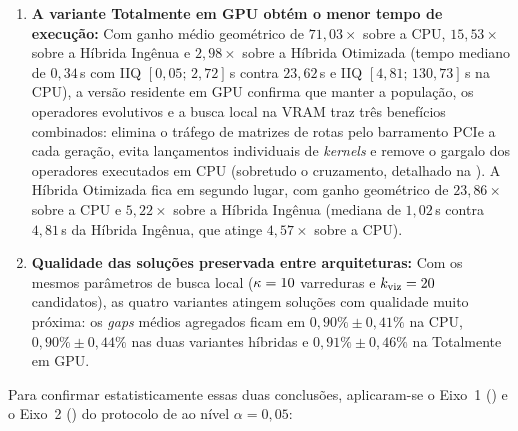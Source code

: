 \begin{enumerate}
  \item
        \textbf{A variante Totalmente em GPU obtém o menor tempo de execução:} Com ganho médio geométrico de \(71{,}03\times\) sobre a CPU, \(15{,}53\times\) sobre a Híbrida Ingênua e \(2{,}98\times\) sobre a Híbrida Otimizada (tempo mediano de \(0{,}34\)\,s com IIQ \([0{,}05;\, 2{,}72]\)\,s contra \(23{,}62\)\,s e IIQ \([4{,}81;\, 130{,}73]\)\,s na CPU), a versão residente em GPU confirma que manter a população, os operadores evolutivos e a busca local na VRAM traz três benefícios combinados: elimina o tráfego de matrizes de rotas pelo barramento PCIe a cada geração, evita lançamentos individuais de \emph{kernels} e remove o gargalo dos operadores executados em CPU (sobretudo o cruzamento, detalhado na ).
        A Híbrida Otimizada fica em segundo lugar, com ganho geométrico de \(23{,}86\times\) sobre a CPU e \(5{,}22\times\) sobre a Híbrida Ingênua (mediana de \(1{,}02\)\,s contra \(4{,}81\)\,s da Híbrida Ingênua, que atinge \(4{,}57\times\) sobre a CPU).
  \item
        \textbf{Qualidade das soluções preservada entre arquiteturas:} Com os mesmos parâmetros de busca local (\(\kappa = 10\) varreduras e \(k_{\text{viz}} = 20\) candidatos), as quatro variantes atingem soluções com qualidade muito próxima: os \emph{gaps} médios agregados ficam em \(0{,}90\% \pm 0{,}41\%\) na CPU, \(0{,}90\% \pm 0{,}44\%\) nas duas variantes híbridas e \(0{,}91\% \pm 0{,}46\%\) na Totalmente em GPU.
\end{enumerate}

Para confirmar estatisticamente essas duas conclusões, aplicaram-se o Eixo~1 () e o Eixo~2 () do protocolo de \textcite{demsar2006statistical} ao nível \(\alpha = 0{,}05\):

